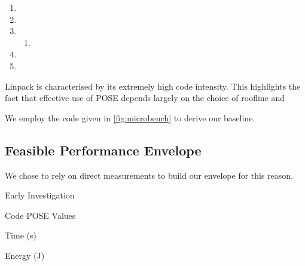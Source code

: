 \begin{enumerate}
	\item {}
	\item {}
	\item {}
	\begin{enumerate}
		\item {}
	\end{enumerate}
	\item {}
	\item {}
\end{enumerate}



Linpack is characterised by its extremely high code intensity. 
This highlights the fact that effective use of POSE depends largely on the choice of roofline and 





We employ the code given in \autoref{fig:microbench} to derive our baseline.  

\subsection{Feasible Performance Envelope}

We chose to rely on direct measurements to build our envelope for this reason.


\begin{table}
\centering
\caption{Early Investigation}

\end{table} 



  \begin{table}
    \setlength{\tabcolsep}{.5em}
    \caption{Code POSE Values}
    \begin{subtable}{\textwidth}
    \centering
    \caption{Time (s)}
    
    \end{subtable} 
    \begin{subtable}{\textwidth}
    \centering
    \caption{Energy (J)}
    
    \end{subtable}
    \label{tab:pose_params}
  \end{table} 



